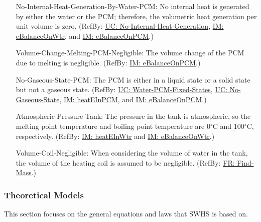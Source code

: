 \documentclass[12pt]{article}
\begin{document}
\begin{itemize}
\item[No-Internal-Heat-Generation-By-Water-PCM:\phantomsection\label{assumpNIHGBWP}]No internal heat is generated by either the water or the PCM; therefore, the volumetric heat generation per unit volume is zero. (RefBy: \hyperref[unlikeChgNIHG]{UC: No-Internal-Heat-Generation}, \hyperref[IM:eBalanceOnWtr]{IM: eBalanceOnWtr}, and \hyperref[IM:eBalanceOnPCM]{IM: eBalanceOnPCM}.)
\item[Volume-Change-Melting-PCM-Negligible:\phantomsection\label{assumpVCMPN}]The volume change of the PCM due to melting is negligible. (RefBy: \hyperref[IM:eBalanceOnPCM]{IM: eBalanceOnPCM}.)
\item[No-Gaseous-State-PCM:\phantomsection\label{assumpNGSP}]The PCM is either in a liquid state or a solid state but not a gaseous state. (RefBy: \hyperref[unlikeChgWPFS]{UC: Water-PCM-Fixed-States}, \hyperref[unlikeChgNGS]{UC: No-Gaseous-State}, \hyperref[IM:heatEInPCM]{IM: heatEInPCM}, and \hyperref[IM:eBalanceOnPCM]{IM: eBalanceOnPCM}.)
\item[Atmospheric-Pressure-Tank:\phantomsection\label{assumpAPT}]The pressure in the tank is atmospheric, so the melting point temperature and boiling point temperature are 0${}^{\circ}$C and 100${}^{\circ}$C, respectively. (RefBy: \hyperref[IM:heatEInWtr]{IM: heatEInWtr} and \hyperref[IM:eBalanceOnWtr]{IM: eBalanceOnWtr}.)
\item[Volume-Coil-Negligible:\phantomsection\label{assumpVCN}]When considering the volume of water in the tank, the volume of the heating coil is assumed to be negligible. (RefBy: \hyperref[findMass]{FR: Find-Mass}.)
\end{itemize}
\subsubsection{Theoretical Models}
\label{Sec:TMs}
This section focuses on the general equations and laws that SWHS is based on.
\par~
\end{document}
